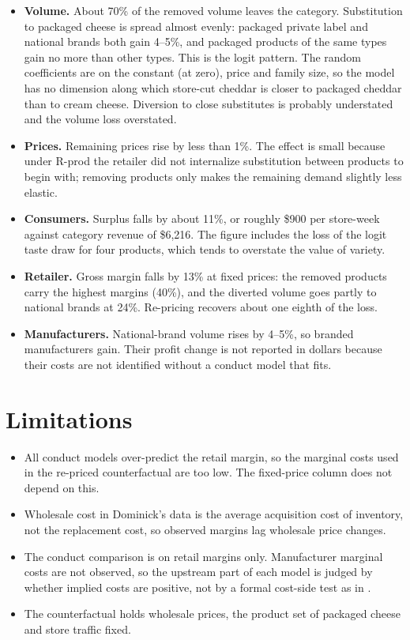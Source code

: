 \documentclass[11pt]{article}
\newcommand{\model}[1]{\textsf{#1}}
\begin{document}
\begin{itemize}
  \item \textbf{Volume.} About 70\% of the removed volume leaves the category. Substitution
        to packaged cheese is spread almost evenly: packaged private label and national
        brands both gain 4--5\%, and packaged products of the same types gain no more than
        other types. This is the logit pattern. The random coefficients are on the constant
        (at zero), price and family size, so the model has no dimension along which
        store-cut cheddar is closer to packaged cheddar than to cream cheese. Diversion to
        close substitutes is probably understated and the volume loss overstated.
  \item \textbf{Prices.} Remaining prices rise by less than 1\%. The effect is small because
        under \model{R-prod} the retailer did not internalize substitution between products
        to begin with; removing products only makes the remaining demand slightly less
        elastic.
  \item \textbf{Consumers.} Surplus falls by about 11\%, or roughly \$900 per store-week
        against category revenue of \$6,216. The figure includes the loss of the logit taste
        draw for four products, which tends to overstate the value of variety.
  \item \textbf{Retailer.} Gross margin falls by 13\% at fixed prices: the removed products
        carry the highest margins (40\%), and the diverted volume goes partly to national
        brands at 24\%. Re-pricing recovers about one eighth of the loss.
  \item \textbf{Manufacturers.} National-brand volume rises by 4--5\%, so branded
        manufacturers gain. Their profit change is not reported in dollars because their
        costs are not identified without a conduct model that fits.
\end{itemize}

\section{Limitations}\label{sec:limits}

\begin{itemize}
  \item All conduct models over-predict the retail margin, so the marginal costs used in the
        re-priced counterfactual are too low. The fixed-price column does not depend on
        this.
  \item Wholesale cost in Dominick's data is the average acquisition cost of inventory, not
        the replacement cost, so observed margins lag wholesale price changes.
  \item The conduct comparison is on retail margins only. Manufacturer marginal costs are
        not observed, so the upstream part of each model is judged by whether implied costs
        are positive, not by a formal cost-side test as in \citet{villasboas2007}.
  \item The counterfactual holds wholesale prices, the product set of packaged cheese and
        store traffic fixed.
\end{itemize}
\end{document}

